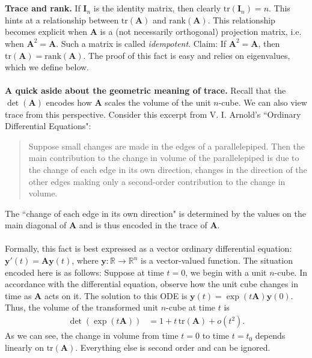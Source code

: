 \documentclass{article}
\begin{document}
\\ \\
\textbf{Trace and rank.} If $\mathbf{I}_n$ is the identity matrix, then clearly $\text{tr}(\mathbf{I}_n) = n$. This hints at a relationship between $\text{tr}(\mathbf{A})$ and $\text{rank}(\mathbf{A})$. This relationship becomes explicit when $\mathbf{A}$ is a (not necessarily orthogonal) projection matrix, i.e. when $\mathbf{A}^2 = \mathbf{A}$. Such a matrix is called \textit{idempotent}. Claim: If $\mathbf{A}^2 = \mathbf{A}$, then $\text{tr}(\mathbf{A}) = \text{rank}(\mathbf{A})$. The proof of this fact is easy and relies on eigenvalues, which we define below.
\\ \\
\textbf{A quick aside about the geometric meaning of trace.} Recall that the $\det(\mathbf{A})$ encodes how $\mathbf{A}$ scales the volume of the unit $n$-cube. We can also view trace from this perspective. Consider this excerpt from V. I. Arnold's ``Ordinary Differential Equations": 
\begin{quote}
Suppose small changes are made in the edges of a parallelepiped. Then the main contribution to the change in volume of the parallelepiped is due to the change of each edge in its own direction, changes in the direction of the other edges making only a second-order contribution to the change in volume.
\end{quote}
The ``change of each edge in its own direction" is determined by the values on the main diagonal of $\mathbf{A}$ and is thus encoded in the trace of $\mathbf{A}$. 
\\ \\
Formally, this fact is best expressed as a vector ordinary differential equation: $\textbf{y}'(t) = \mathbf{A}\textbf{y}(t)$, where $\textbf{y}: \mathbb{R} \to \mathbb{R}^n$ is a vector-valued function. The situation encoded here is as follows: Suppose at time $t = 0$, we begin with a unit $n$-cube. In accordance with the differential equation, observe how the unit cube changes in time as $\mathbf{A}$ acts on it. The solution to this ODE is $\textbf{y}(t) = \exp(t\mathbf{A})\textbf{y}(0)$. Thus, the volume of the transformed unit $n$-cube at time $t$ is 
\begin{align*}
\det(\exp(t\mathbf{A})) &= 1 + t\,\text{tr}(\mathbf{A}) + o({t}^2).
\end{align*}
As we can see, the change in volume from time $t=0$ to time $t=t_0$ depends linearly on $\text{tr}(\mathbf{A})$. Everything else is second order and can be ignored. 
\end{document}
